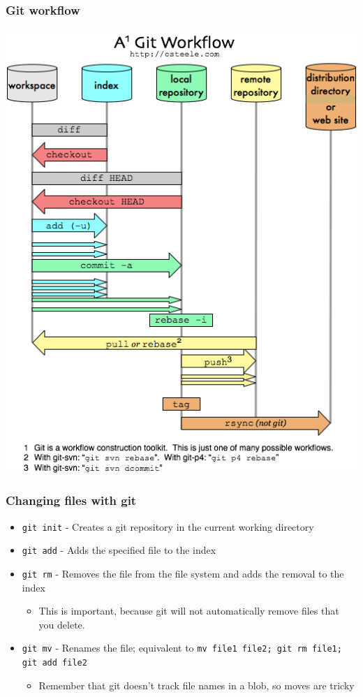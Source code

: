 \documentclass{beamer}
\begin{document}
\begin{frame}
  \frametitle{Git workflow}
  \includegraphics[scale = 0.3]{images/git-workflow.png}
\end{frame}

\begin{frame}
  \frametitle{Changing files with git}
  \begin{itemize}
    \item {\tt git init} - Creates a git repository in the current working directory
    \item {\tt git add} - Adds the specified file to the index
    \item {\tt git rm} - Removes the file from the file system and adds the removal to the index
      \begin{itemize}
	\item This is important, because git will not automatically remove files that you delete.
      \end{itemize}
    \item {\tt git mv} - Renames the file; equivalent to {\tt mv file1 file2; git rm file1; git add file2}
      \begin{itemize}
	\item Remember that git doesn't track file names in a blob, so moves are tricky
      \end{itemize}
  \end{itemize}
\end{frame}
\end{document}
